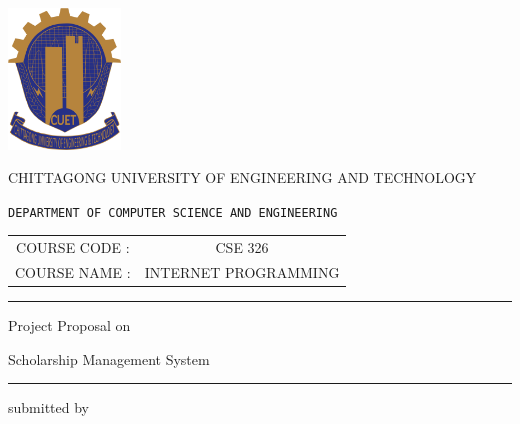 \documentclass[a4paper,12pt]{report}
\begin{document}
\begin{titlepage}
	\scshape
	\centering

	\includegraphics[width=3cm, keepaspectratio]{cuet.png} \par \vspace{0.1cm}
	\begin{Large}
		CHITTAGONG UNIVERSITY OF ENGINEERING AND TECHNOLOGY
	\end{Large}
	\par
	\texttt{DEPARTMENT OF COMPUTER SCIENCE AND ENGINEERING}
	\vspace{2cm}

	\begin{tabular}{cc}
		COURSE CODE : & CSE 326              \\
		COURSE NAME : & INTERNET PROGRAMMING
	\end{tabular}
	\vspace{1cm}

	\raisebox{-\baselineskip}{\rule{\textwidth}{1px}}
	\rule{\textwidth}{1px}

	\vspace{0.2cm}
	{\Large{{Project Proposal on}}}\par \vspace{0.5cm}
	\huge{{Scholarship Management System }}
	\rule{\textwidth}{2px}


	\vspace{2cm}
	\normalsize

	\parbox[l]{8cm}{
		\begin{center}
			submitted by
		\end{center}

}
\end{titlepage}
\end{document}
